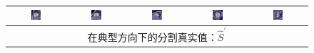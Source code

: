 \begin{figure}
\begin{center}
\begin{tabular}{ccccc}
\includegraphics[width=0.19\textwidth]{./data/representative-results/overt/HCMNet_1100083/00_SAX/BASE/0_pred.png} &
\includegraphics[width=0.19\textwidth]{./data/representative-results/overt/HCMNet_1100083/00_SAX/MID/0_pred.png} &
\includegraphics[width=0.19\textwidth]{./data/representative-results/overt/HCMNet_1100083/00_SAX/APEX/0_pred.png} &
\includegraphics[width=0.19\textwidth]{./data/representative-results/overt/HCMNet_1100367/01_HLA/00/0_pred.png} &
\includegraphics[width=0.19\textwidth]{./data/representative-results/overt/HCMNet_1100027/02_VLA/00/0_pred.png} \\
\bottomrule

\multicolumn{5}{c}{在典型方向下的分割真实值：$\hat{S}^\prime$} \\


\end{tabular}
\end{center}
\end{figure}
